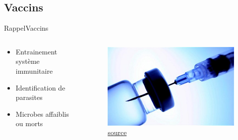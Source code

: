\documentclass{PresentationHEIGVD}
\begin{document}
\subsection{Vaccins}
\begin{frame}{Rappel}{Vaccins}
\begin{columns}[c]
	\begin{column}[c]{5cm}
		\begin{itemize}[<+->]
			\item Entrainement système immunitaire
			\item Identification de parasites
			\item Microbes affaiblis ou morts
		\end{itemize}
	\end{column}
	\begin{column}[c]{5cm}
		\begin{figure}
		\includegraphics[width=\textwidth]{img/vaccine}
		\caption{\href{http://vaccineresistancemovement.org/wp-content/uploads/2010/05/Universal-Flu-Vaccine1.jpg}{source}}
	\end{figure}
	\end{column}
\end{columns}

\end{frame}
\end{document}
